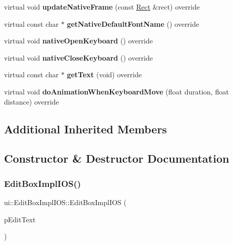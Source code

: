 \begin{DoxyCompactItemize}
virtual void {\bfseries update\+Native\+Frame} (const \hyperlink{classRect}{Rect} \&rect) override
\item 
\mbox{\label{classui_1_1EditBoxImplIOS_a69420d8cc26f0a6844fc25ea41550b82}} 
virtual const char $\ast$ {\bfseries get\+Native\+Default\+Font\+Name} () override
\item 
\mbox{\label{classui_1_1EditBoxImplIOS_ab62fafac55f853d3408121f4405737f6}} 
virtual void {\bfseries native\+Open\+Keyboard} () override
\item 
\mbox{\label{classui_1_1EditBoxImplIOS_a3488f031f6b03b14b446aa8b8110c494}} 
virtual void {\bfseries native\+Close\+Keyboard} () override
\item 
\mbox{\label{classui_1_1EditBoxImplIOS_a831c7062d4f841489588029ea48c4870}} 
virtual const char $\ast$ {\bfseries get\+Text} (void) override
\item 
\mbox{\label{classui_1_1EditBoxImplIOS_aee54e88a2c553eb69a9984b994f3c848}} 
virtual void {\bfseries do\+Animation\+When\+Keyboard\+Move} (float duration, float distance) override
\end{DoxyCompactItemize}
\subsection*{Additional Inherited Members}


\subsection{Constructor \& Destructor Documentation}
\mbox{\label{classui_1_1EditBoxImplIOS_a3beb5f89d2ac3c58a021d744c89bfb01}} 
\subsubsection{\texorpdfstring{Edit\+Box\+Impl\+I\+O\+S()}{EditBoxImplIOS()}\hspace{0.1cm}{\footnotesize\ttfamily [1/2]}}
{\footnotesize\ttfamily ui\+::\+Edit\+Box\+Impl\+I\+O\+S\+::\+Edit\+Box\+Impl\+I\+OS (\begin{DoxyParamCaption}\item[{\hyperlink{classui_1_1EditBox}{Edit\+Box} $\ast$}]{p\+Edit\+Text }\end{DoxyParamCaption})}

